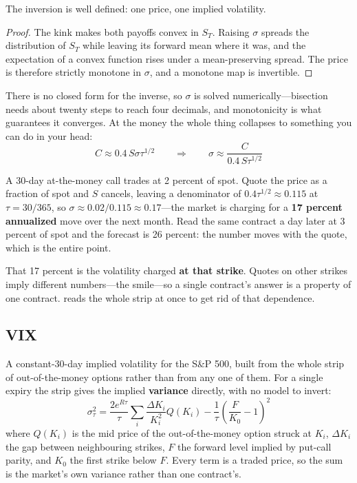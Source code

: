 \begin{claim}\label{clm:inversion}
The inversion is well defined: one price, one implied volatility.
\end{claim}

\begin{proof}
The kink makes both payoffs convex in $S_T$. Raising $\sigma$ spreads the distribution of $S_T$
while leaving its forward mean where it was, and the expectation of a convex function rises under a
mean-preserving spread. The price is therefore strictly monotone in $\sigma$, and a monotone map is
invertible.
\end{proof}

There is no closed form for the inverse, so $\sigma$ is solved numerically---bisection needs about
twenty steps to reach four decimals, and monotonicity is what guarantees it converges. At the money
the whole thing collapses to something you can do in your head:
\[
  C \approx 0.4\, S \sigma \tau^{1/2}
  \qquad \Longrightarrow \qquad
  \sigma \approx \frac{C}{0.4\, S \tau^{1/2}}
\]

\begin{example}\label{ex:implied-vol}
A 30-day at-the-money call trades at 2 percent of spot. Quote the price as a fraction of spot and
$S$ cancels, leaving a denominator of $0.4 \tau^{1/2} \approx 0.115$ at $\tau = 30/365$, so
$\sigma \approx 0.02/0.115 \approx 0.17$---the market is charging for a \textbf{17 percent
annualized} move over the next month. Read the same contract a day later at 3 percent of spot and
the forecast is 26 percent: the number moves with the quote, which is the entire point.
\end{example}

\begin{note}
That 17 percent is the volatility charged \textbf{at that strike}. Quotes on other strikes imply
different numbers---the smile---so a single contract's answer is a property of one contract.
 reads the whole strip at once to get rid of that dependence.
\end{note}

\subsection{VIX}\label{sec:vix}

\begin{definition}[VIX]\label{def:vix}
A constant-30-day implied volatility for the S\&P 500, built from the whole strip of
out-of-the-money options rather than from any one of them. For a single expiry the strip gives the
implied \textbf{variance} directly, with no model to invert:
\[
  \sigma^2_\tau = \frac{2 e^{R \tau}}{\tau} \sum_i \frac{\Delta K_i}{K_i^2} Q(K_i)
                  - \frac{1}{\tau} \left( \frac{F}{K_0} - 1 \right)^2
\]
where $Q(K_i)$ is the mid price of the out-of-the-money option struck at $K_i$, $\Delta K_i$ the gap
between neighbouring strikes, $F$ the forward level implied by put-call parity, and $K_0$ the first
strike below $F$. Every term is a traded price, so the sum is the market's own variance rather than
one contract's.
\end{definition}

